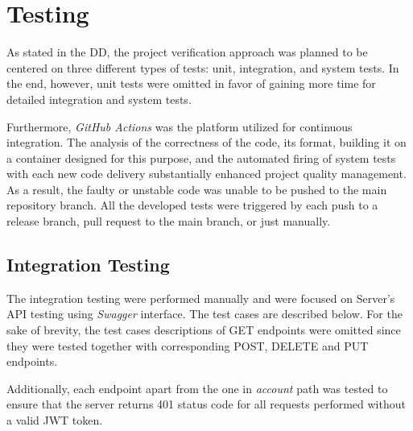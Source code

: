 \chapter{Testing} \label{ch:testing}

As stated in the DD, the project verification approach was planned to be centered on three different types of tests: unit, integration, and system tests. In the end, however, unit tests were omitted in favor of gaining more time for detailed integration and system tests.

Furthermore, \textit{GitHub Actions} was the platform utilized for continuous integration. The analysis of the correctness of the code, its format, building it on a container designed for this purpose, and the automated firing of system tests with each new code delivery substantially enhanced project quality management. As a result, the faulty or unstable code was unable to be pushed to the main repository branch. All the developed tests were triggered by each push to a release branch, pull request to the main branch, or just manually.

\section{Integration Testing}
The integration testing were performed manually and were focused on Server's API testing using \textit{Swagger} interface. The test cases are described below. For the sake of brevity, the test cases descriptions of GET endpoints were omitted since they were tested together with corresponding POST, DELETE and PUT endpoints.

Additionally, each endpoint apart from the one in \textit{account} path was tested to ensure that the server returns 401 status code for all requests performed without a valid JWT token.

